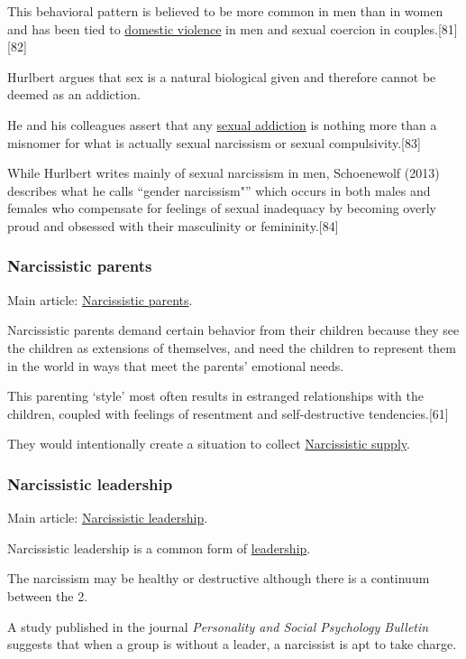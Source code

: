 \documentclass[oneside]{book}
\numberwithin{equation}{section}
\begin{document}
This behavioral pattern is believed to be more common in men than in women and has been tied to \href{https://en.wikipedia.org/wiki/Domestic_violence}{domestic violence} in men and sexual coercion in couples.[81][82]

Hurlbert argues that sex is a natural biological given and therefore cannot be deemed as an addiction.

He and his colleagues assert that any \href{https://en.wikipedia.org/wiki/Sexual_addiction}{sexual addiction} is nothing more than a misnomer for what is actually sexual narcissism or sexual compulsivity.[83]

While Hurlbert writes mainly of sexual narcissism in men, Schoenewolf (2013) describes what he calls ``gender narcissism"'' which occurs in both males and females who compensate for feelings of sexual inadequacy by becoming overly proud and obsessed with their masculinity or femininity.[84]

\subsubsection{Narcissistic parents}
Main article: \href{https://en.wikipedia.org/wiki/Narcissistic_parents}{Narcissistic parents}.

Narcissistic parents demand certain behavior from their children because they see the children as extensions of themselves, and need the children to represent them in the world in ways that meet the parents' emotional needs.

This parenting `style' most often results in estranged relationships with the children, coupled with feelings of resentment and self-destructive tendencies.[61]

They would intentionally create a situation to collect \href{https://en.wikipedia.org/wiki/Narcissistic_supply}{Narcissistic supply}.

\subsubsection{Narcissistic leadership}
Main article: \href{https://en.wikipedia.org/wiki/Narcissistic_leadership}{Narcissistic leadership}.

Narcissistic leadership is a common form of \href{https://en.wikipedia.org/wiki/Leadership}{leadership}.

The narcissism may be healthy or destructive although there is a continuum between the 2.

A study published in the journal \textit{Personality and Social Psychology Bulletin} suggests that when a group is without a leader, a narcissist is apt to take charge.
\end{document}
